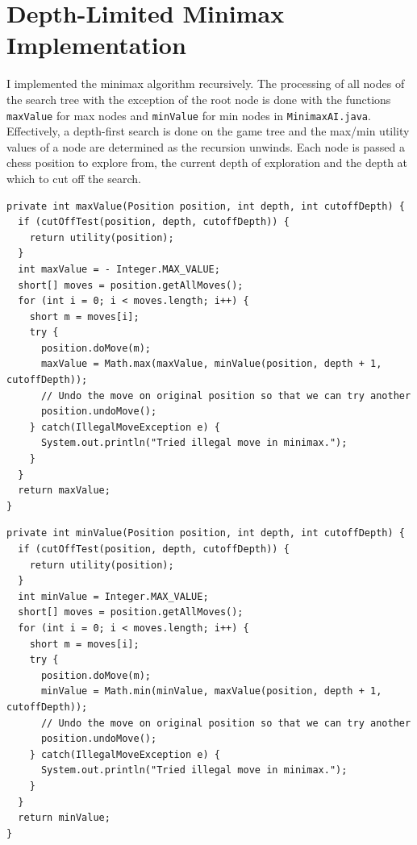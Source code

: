 \documentclass{article}
\begin{document}
\section{Depth-Limited Minimax Implementation}

I implemented the minimax algorithm recursively. The processing of all nodes of the search tree with the exception of the root node is done with the functions \verb`maxValue` for max nodes and \verb`minValue` for min nodes in \verb`MinimaxAI.java`. Effectively, a depth-first search is done on the game tree and the max/min utility values of a node are determined as the recursion unwinds. Each node is passed a chess position to explore from, the current depth of exploration and the depth at which to cut off the search.

\vspace{5mm}

\begin{lstlisting}
private int maxValue(Position position, int depth, int cutoffDepth) {
  if (cutOffTest(position, depth, cutoffDepth)) {
    return utility(position);
  }
  int maxValue = - Integer.MAX_VALUE;
  short[] moves = position.getAllMoves();
  for (int i = 0; i < moves.length; i++) {
    short m = moves[i];
    try {
      position.doMove(m);
      maxValue = Math.max(maxValue, minValue(position, depth + 1, cutoffDepth));
      // Undo the move on original position so that we can try another
      position.undoMove();
    } catch(IllegalMoveException e) {
      System.out.println("Tried illegal move in minimax.");
    }
  }
  return maxValue;
}
\end{lstlisting}

\vspace{5mm}

\begin{lstlisting}
private int minValue(Position position, int depth, int cutoffDepth) {
  if (cutOffTest(position, depth, cutoffDepth)) {
    return utility(position);
  }
  int minValue = Integer.MAX_VALUE;
  short[] moves = position.getAllMoves();
  for (int i = 0; i < moves.length; i++) {
    short m = moves[i];
    try {
      position.doMove(m);
      minValue = Math.min(minValue, maxValue(position, depth + 1, cutoffDepth));
      // Undo the move on original position so that we can try another
      position.undoMove();
    } catch(IllegalMoveException e) {
      System.out.println("Tried illegal move in minimax.");
    }
  }
  return minValue;
}
\end{lstlisting}
\end{document}
